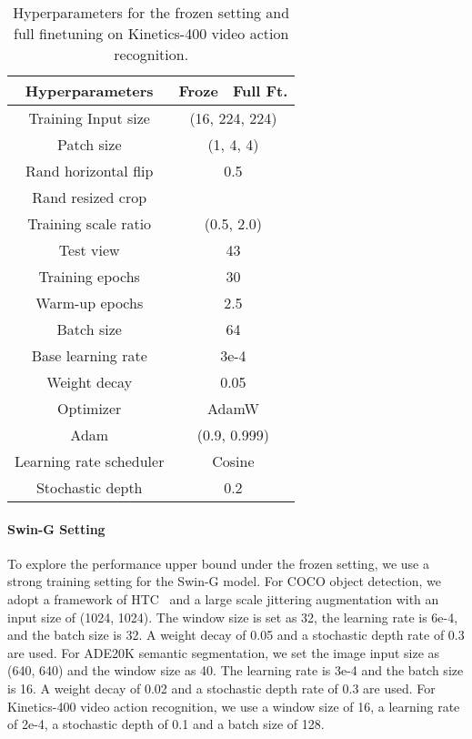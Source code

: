 \documentclass{article}
\newcommand{\cmark}{\text{\ding{51}}}
\begin{document}
\begin{table}[h]\small
    \centering \begin{tabular}{c|cc}
    \toprule
    \textbf{Hyperparameters} & \textbf{Froze} & \textbf{Full Ft.} \\
    \hline
    Training Input size & \multicolumn{2}{c}{(16, 224, 224)} \\
    Patch size & \multicolumn{2}{c}{(1, 4, 4)} \\
    Rand horizontal flip & \multicolumn{2}{c}{0.5} \\
    Rand resized crop & \multicolumn{2}{c}{\cmark} \\
    Training scale ratio & \multicolumn{2}{c}{(0.5, 2.0)} \\
    Test view & \multicolumn{2}{c}{43} \\
    \hline
    Training epochs & \multicolumn{2}{c}{30} \\
    Warm-up epochs & \multicolumn{2}{c}{2.5} \\
    Batch size & \multicolumn{2}{c}{64} \\
    Base learning rate & \multicolumn{2}{c}{3e-4} \\
    Weight decay & \multicolumn{2}{c}{0.05} \\
    Optimizer & \multicolumn{2}{c}{AdamW} \\
    Adam  & \multicolumn{2}{c}{(0.9, 0.999)} \\
    Learning rate scheduler & \multicolumn{2}{c}{Cosine} \\
    Stochastic depth & \multicolumn{2}{c}{0.2} \\
    \bottomrule
    \end{tabular}
    \vspace{0.5em}
    \caption{Hyperparameters for the frozen setting and full finetuning on Kinetics-400 video action recognition.}
    \label{table:setting-video}
\end{table}

\paragraph{Swin-G Setting}

To explore the performance upper bound under the frozen setting, we use a strong training setting for the Swin-G model.
For COCO object detection, we adopt a framework of HTC~\cite{chen2019htc,liu2021swin} and a large scale jittering augmentation with an input size of (1024, 1024). The window size is set as 32, the learning rate is 6e-4, and the batch size is 32. A weight decay of 0.05 and a stochastic depth rate of 0.3 are used.
For ADE20K semantic segmentation, we set the image input size as (640, 640) and the window size as 40. The learning rate is 3e-4 and the batch size is 16. A weight decay of 0.02 and a stochastic depth rate of 0.3 are used.
For Kinetics-400 video action recognition, we use a window size of 16, a learning rate of 2e-4, a stochastic depth of 0.1 and a batch size of 128. 
\end{document}
